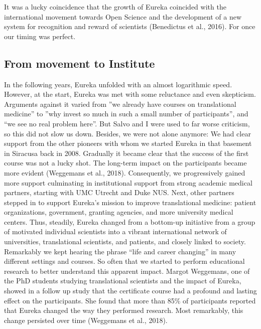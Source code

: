 \documentclass[authordate, editorial, issue]{jote-new-article}
\begin{document}
	It was a lucky coincidence that the growth of Eureka coincided with the international movement towards Open Science and the development of a new system for recognition and reward of scientists (Benedictus et al., 2016). For once our timing was perfect.







	\subsection{From movement to Institute}



	In the following years, Eureka unfolded with an almost logarithmic speed. However, at the start, Eureka was met with some reluctance and even skepticism. Arguments against it varied from ”we already have courses on translational medicine” to ”why invest so much in such a small number of participants”, and “we see no real problem here”. But Salvo and I were used to far worse criticism, so this did not slow us down. Besides, we were not alone anymore: We had clear support from the other pioneers with whom we started Eureka in that basement in Siracusa back in 2008. Gradually it became clear that the success of the first course was not a lucky shot. The long-term impact on the participants became more evident (Weggemans et al., 2018). Consequently, we progressively gained more support culminating in institutional support from strong academic medical partners, starting with UMC Utrecht and Duke NUS. Next, other partners stepped in to support Eureka's mission to improve translational medicine: patient organizations, government, granting agencies, and more university medical centers. Thus, steadily, Eureka changed from a bottom-up initiative from a group of motivated individual scientists into a vibrant international network of universities, translational scientists, and patients, and closely linked to society. Remarkably we kept hearing the phrase “life and career changing” in many different settings and courses. So often that we started to perform educational research to better understand this apparent impact. Margot Weggemans, one of the PhD students studying translational scientists and the impact of Eureka, showed in a follow up study that the certificate course had a profound and lasting effect on the participants. She found that more than 85\% of participants reported that Eureka changed the way they performed research. Most remarkably, this change persisted over time (Weggemans et al., 2018).
\end{document}
